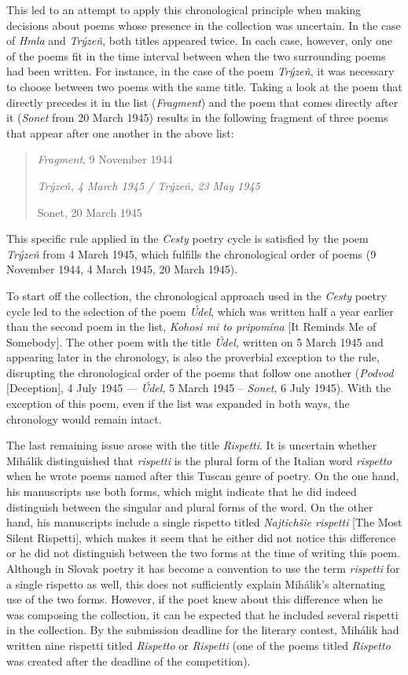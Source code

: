 \begin{paper}
This led to an attempt to apply this chronological principle when making
decisions about poems whose presence in the collection was uncertain. In
the case of \emph{Hmla} and \emph{Trýzeň}, both titles appeared twice.
In each case, however, only one of the poems fit in the time interval
between when the two surrounding poems had been written. For instance,
in the case of the poem \emph{Trýzeň}, it was necessary to choose
between two poems with the same title. Taking a look at the poem that
directly precedes it in the list (\emph{Fragment}) and the poem that
comes directly after it (\emph{Sonet} from 20 March 1945) results in the
following fragment of three poems that appear after one another in the above
list:
\begin{quote}
\emph{Fragment}, 9 November 1944

\emph{Trýzeň, 4 March 1945 / Trýzeň, 23 May 1945}

Sonet, 20 March 1945
\end{quote}
This specific rule applied in the \emph{Cesty} poetry cycle is satisfied
by the poem \emph{Trýzeň} from 4 March 1945, which fulfills the
chronological order of poems (9 November 1944, 4 March 1945, 20 March
1945).

To start off the collection, the chronological approach used in the
\emph{Cesty} poetry cycle led to the selection of the poem \emph{Údel},
which was written half a year earlier than the second poem in the list,
\emph{Kohosi mi to pripomína} [It Reminds Me of Somebody]. The other
poem with the title \emph{Údel,} written on 5 March 1945 and appearing
later in the chronology, is also the proverbial exception to the rule,
disrupting the chronological order of the poems that follow one another
(\emph{Podvod} [Deception], 4 July 1945 –– \emph{Údel}, 5 March 1945 --
\emph{Sonet}, 6 July 1945). With the exception of this poem\emph{,} even
if the list was expanded in both ways, the chronology would remain
intact.

The last remaining issue arose with the title \emph{Rispetti}. It is
uncertain whether Mihálik distinguished that \emph{rispetti} is the
plural form of the Italian word \emph{rispetto} when he wrote poems
named after this Tuscan genre of poetry. On the one hand, his
manuscripts use both forms, which might indicate that he did indeed
distinguish between the singular and plural forms of the word. On the
other hand, his manuscripts include a single rispetto titled
\emph{Najtichšie rispetti} [The Most Silent Rispetti], which makes it
seem that he either did not notice this difference or he did not
distinguish between the two forms at the time of writing this poem.
Although in Slovak poetry it has become a convention to use the term
\emph{rispetti} for a single rispetto as well, this does not
sufficiently explain Mihálik's alternating use of the two forms.
However, if the poet knew about this difference when he was composing
the collection\emph{,} it can be expected that he included several
rispetti in the collection. By the submission deadline for the literary
contest, Mihálik had written nine rispetti titled \emph{Rispetto} or
\emph{Rispetti} (one of the poems titled \emph{Rispetto} was created
after the deadline of the competition).


\end{paper}
